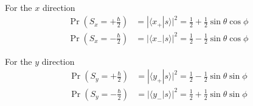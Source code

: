 For the $x$ direction
\begin{align*}
\Pr\left(S_x=+\tfrac{\hbar}{2}\right)&=|\langle x_+|s\rangle|^2=\tfrac{1}{2}+\tfrac{1}{2}\sin\theta\cos\phi
\\
\Pr\left(S_x=-\tfrac{\hbar}{2}\right)&=|\langle x_-|s\rangle|^2=\tfrac{1}{2}-\tfrac{1}{2}\sin\theta\cos\phi
\end{align*}

For the $y$ direction
\begin{align*}
\Pr\left(S_y=+\tfrac{\hbar}{2}\right)&=|\langle y_+|s\rangle|^2=\tfrac{1}{2}-\tfrac{1}{2}\sin\theta\sin\phi
\\
\Pr\left(S_y=-\tfrac{\hbar}{2}\right)&=|\langle y_-|s\rangle|^2=\tfrac{1}{2}+\tfrac{1}{2}\sin\theta\sin\phi
\end{align*}


